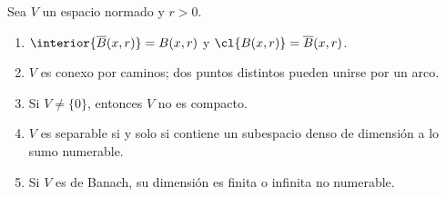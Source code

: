 \begin{proposicion}\label{ch19:geometria}
Sea $V$ un espacio normado y $r>0$.
\begin{enumerate}[label=(\roman*)]
\item $\interior{\overline B(x,r)}=B(x,r)$ y $\cl{B(x,r)}=\overline B(x,r)$.
\item $V$ es conexo por caminos; dos puntos distintos pueden unirse por un arco.
\item Si $V\ne\{0\}$, entonces $V$ no es compacto.
\item $V$ es separable si y solo si contiene un subespacio denso de dimensión a lo sumo numerable.
\item Si $V$ es de Banach, su dimensión es finita o infinita no numerable.
\end{enumerate}
\end{proposicion}
